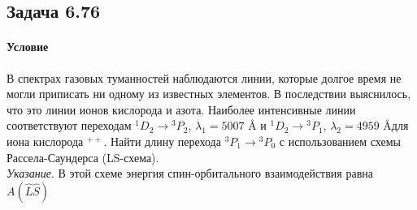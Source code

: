 \documentclass[12pt]{article}
\begin{document}
\subsection{Задача 6.76}
\label{task_6.76}
\paragraph{Условие}
В спектрах газовых туманностей наблюдаются линии, которые долгое время не могли приписать ни одному из известных элементов. В последствии выяснилось, что это линии ионов кислорода и азота. Наиболее интенсивные линии соответствуют переходам ${}^1D_2 \rightarrow {}^3P_2$, $\lambda_1 = 5007$ \AA\text{ } и ${}^1D_2 \rightarrow {}^3P_1$, $\lambda_2 = 4959$ \AA\text{ }для иона кислорода ${}^{++}$. Найти длину перехода ${}^3P_1 \rightarrow {}^3P_0$ с использованием схемы Рассела-Саундерса (LS-схема).\\
\textit{Указание}. В этой схеме энергия спин-орбитального взаимодействия равна $A( \hat{L}\hat{S} )$
\end{document}
